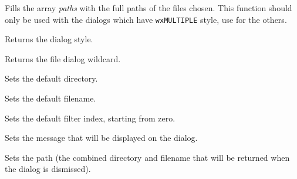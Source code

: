 \label{wxfiledialoggetpaths}


Fills the array {\it paths} with the full paths of the files chosen. This
function should only be used with the dialogs which have {\tt wxMULTIPLE} style,
use  for the others.

\label{wxfiledialoggetstyle}


Returns the dialog style.

\label{wxfiledialoggetwildcard}


Returns the file dialog wildcard.

\label{wxfiledialogsetdirectory}


Sets the default directory.

\label{wxfiledialogsetfilename}


Sets the default filename.

\label{wxfiledialogsetfilterindex}


Sets the default filter index, starting from zero.

\label{wxfiledialogsetmessage}


Sets the message that will be displayed on the dialog.

\label{wxfiledialogsetpath}


Sets the path (the combined directory and filename that will be returned when the dialog is dismissed).

\label{wxfiledialogsetstyle}

